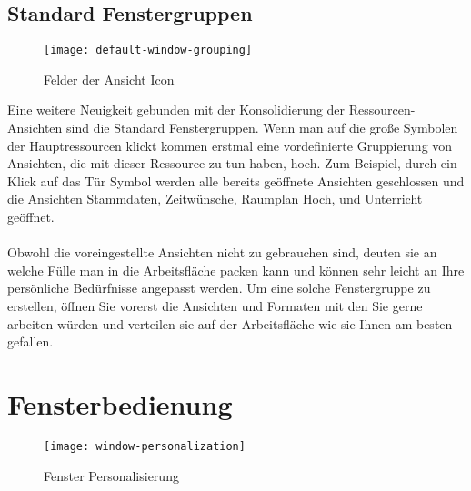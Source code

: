 \subsection{Standard Fenstergruppen}

\begin{wrapfigure}{r}{0.4\textwidth}
	\vspace{-14pt}
	\texttt{[image: default-window-grouping]}
	\vspace{-5pt}
	\caption{Felder der Ansicht Icon}
	\label{fig:default-window-grouping}
	\vspace{-10pt}
\end{wrapfigure}

Eine weitere Neuigkeit gebunden mit der Konsolidierung der Ressourcen-Ansichten sind die Standard Fenstergruppen. Wenn man auf die große Symbolen der Hauptressourcen klickt kommen erstmal eine vordefinierte Gruppierung von Ansichten, die mit dieser Ressource zu tun haben, hoch. Zum Beispiel, durch ein Klick auf das Tür Symbol werden alle bereits geöffnete Ansichten geschlossen und die Ansichten Stammdaten, Zeitwünsche, Raumplan Hoch, und Unterricht geöffnet.\\
\\
Obwohl die voreingestellte Ansichten nicht zu gebrauchen sind, deuten sie an welche Fülle man in die Arbeitsfläche packen kann und können sehr leicht an Ihre persönliche Bedürfnisse angepasst werden. Um eine solche Fenstergruppe zu erstellen, öffnen Sie vorerst die Ansichten und Formaten mit den Sie gerne arbeiten würden und verteilen sie auf der Arbeitsfläche wie sie Ihnen am besten gefallen.\\

\section{Fensterbedienung}

\begin{wrapfigure}{r}{0.4\textwidth}
	\vspace{-14pt}
	\texttt{[image: window-personalization]}
	\vspace{-5pt}
	\caption{Fenster Personalisierung}
	\label{fig:window-personalization}
\end{wrapfigure}

